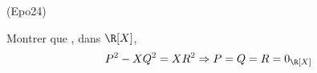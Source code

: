 \begin{tiny}(Epo24)\end{tiny} Montrer que , dans $\R[X]$,
\begin{displaymath}
 P^2-XQ^2 = XR^2 \Rightarrow P=Q=R=0_{\R[X]}
\end{displaymath}
 